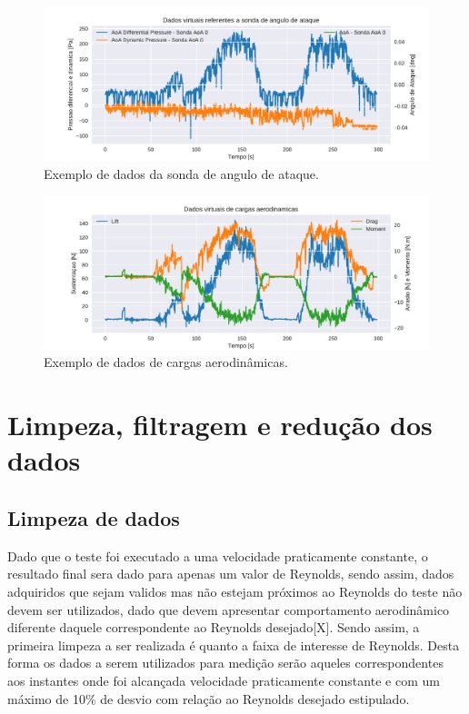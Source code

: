 \begin{figure}[!ht]
    \centering
    \includegraphics[width=.8\linewidth]{plots/aoa_plots.pdf}
    \caption{Exemplo de dados da sonda de angulo de ataque\cite{autor}.}
    \label{fig:raw_aoa_plots}
\end{figure}

\begin{figure}[!ht]
    \centering
    \includegraphics[width=.8\linewidth]{plots/loads_plots.pdf}
    \caption{Exemplo de dados de cargas aerodinâmicas\cite{autor}.}
    \label{fig:raw_load_plots}
\end{figure}

\section{Limpeza, filtragem e redução dos dados}

\subsection{Limpeza de dados}

Dado que o teste foi executado a uma velocidade praticamente constante, o resultado final sera dado para apenas um valor de Reynolds, sendo assim, dados adquiridos que sejam validos mas não estejam próximos ao Reynolds do teste não devem ser utilizados, dado que devem apresentar comportamento aerodinâmico diferente daquele correspondente ao Reynolds desejado[X]. Sendo assim, a primeira limpeza a ser realizada é quanto a faixa de interesse de Reynolds.  Desta forma os dados a serem utilizados para medição serão aqueles correspondentes aos instantes onde foi alcançada velocidade praticamente constante e com um máximo de 10\% de desvio com relação ao Reynolds desejado estipulado.

